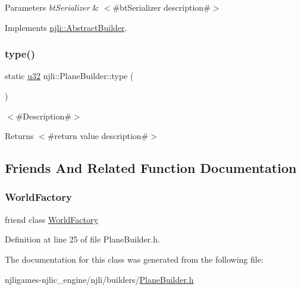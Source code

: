 \begin{DoxyParams}{Parameters}
{\em bt\+Serializer} & $<$\#bt\+Serializer description\#$>$ \\
\hline
\end{DoxyParams}


Implements \mbox{\hyperlink{classnjli_1_1_abstract_builder_ab66b774e02ccb9da554c9aab7fa6d981}{njli\+::\+Abstract\+Builder}}.

\mbox{\label{classnjli_1_1_plane_builder_ae22f7828d8b9e4c0f8257dea57a52edc}} 
\subsubsection{\texorpdfstring{type()}{type()}}
{\footnotesize\ttfamily static \mbox{\hyperlink{_util_8h_a10e94b422ef0c20dcdec20d31a1f5049}{u32}} njli\+::\+Plane\+Builder\+::type (\begin{DoxyParamCaption}{ }\end{DoxyParamCaption})\hspace{0.3cm}{\ttfamily [static]}}

$<$\#\+Description\#$>$

\begin{DoxyReturn}{Returns}
$<$\#return value description\#$>$ 
\end{DoxyReturn}


\subsection{Friends And Related Function Documentation}
\mbox{\label{classnjli_1_1_plane_builder_acb96ebb09abe8f2a37a915a842babfac}} 
\subsubsection{\texorpdfstring{World\+Factory}{WorldFactory}}
{\footnotesize\ttfamily friend class \mbox{\hyperlink{classnjli_1_1_world_factory}{World\+Factory}}\hspace{0.3cm}{\ttfamily [friend]}}



Definition at line 25 of file Plane\+Builder.\+h.



The documentation for this class was generated from the following file\+:\begin{DoxyCompactItemize}
\item 
njligames-\/njlic\+\_\+engine/njli/builders/\mbox{\hyperlink{_plane_builder_8h}{Plane\+Builder.\+h}}\end{DoxyCompactItemize}
